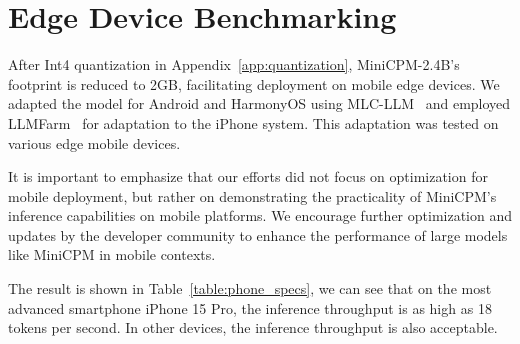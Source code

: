 
\section{Edge Device Benchmarking}

After Int4 quantization in Appendix~\ref{app:quantization}, MiniCPM-2.4B's footprint is reduced to 2GB, facilitating deployment on mobile edge devices. We adapted the model for Android and HarmonyOS using MLC-LLM~\citep{mlc-llm} and employed LLMFarm~\citep{llmfarm} for adaptation to the iPhone system. This adaptation was tested on various edge mobile devices.

It is important to emphasize that our efforts did not focus on optimization for mobile deployment, but rather on demonstrating the practicality of MiniCPM's inference capabilities on mobile platforms. We encourage further optimization and updates by the developer community to enhance the performance of large models like MiniCPM in mobile contexts. 

The result is shown in Table~\ref{table:phone_specs}, we can see that on the most advanced smartphone iPhone 15 Pro, the inference throughput is as high as 18 tokens per second. In other devices, the inference throughput is also acceptable. 


